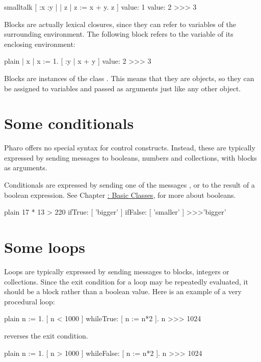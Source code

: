 \documentclass[10pt,twoside,english]{_support/latex/sbabook/sbabook}
\begin{document}
\begin{displaycode}{smalltalk}
[ :x :y |
	| z |
	z := x + y.
	z ] value: 1 value: 2 
>>> 3
\end{displaycode}

Blocks are actually lexical closures, since they can refer to variables of the
surrounding environment. The following block refers to the variable  of its
enclosing environment:

\begin{displaycode}{plain}
| x |
x := 1.
[ :y | x + y ] value: 2 
>>> 3
\end{displaycode}

Blocks are instances of the class . This means that they are
objects, so they can be assigned to variables and passed as arguments just like
any other object.
\section{Some conditionals}
Pharo offers no special syntax for control constructs. Instead, these are
typically expressed by sending messages to booleans, numbers and collections,
with blocks as arguments.

Conditionals are expressed by sending one of the messages ,
 or  to the result of a boolean expression. See
Chapter \hyperref[cha:basicClasses]{: Basic Classes},
for more about booleans.

\begin{displaycode}{plain}
17 * 13 > 220
	ifTrue: [ 'bigger' ]
	ifFalse: [ 'smaller' ] 
>>>'bigger'
\end{displaycode}
\section{Some loops}
Loops are typically expressed by sending messages to blocks, integers or
collections. Since the exit condition for a loop may be repeatedly evaluated, it
should be a block rather than a boolean value. Here is an example of a very
procedural loop:

\begin{displaycode}{plain}
n := 1.
[ n < 1000 ] whileTrue: [ n := n*2 ].
n 
>>> 1024
\end{displaycode}

 reverses the exit condition.

\begin{displaycode}{plain}
n := 1.
[ n > 1000 ] whileFalse: [ n := n*2 ].
n 
>>> 1024
\end{displaycode}
\end{document}
